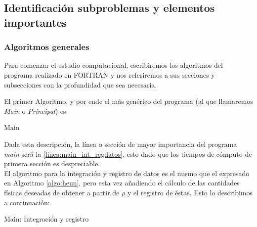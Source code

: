 \subsection{Identificaci\'on subproblemas y elementos importantes}

\subsubsection{Algoritmos generales}\label{sec:codigos_generales}
\quad Para comenzar el estudio computacional, escribiremos los algoritmos del programa realizado en FORTRAN y nos referiremos a sus secciones y subsecciones con la profundidad que sea necesaria.

\quad El primer Algoritmo, y por ende el m\'as gen\'erico del programa (al que llamaremos \emph{Main} o \emph{Principal}) es:

\begin{algorithm}[H]
 \caption{Main}\label{algo:main_completo}
\SetAlgoLined
\LinesNumbered
{}
\end{algorithm}

\quad Dada esta descripci\'on, la l\'inea o secci\'on de mayor importancia del programa \emph{main} ser\'a la \ref{linea:main_int_regdatos}, esto dado que los tiempos de c\'omputo de primera secci\'on es despreciable.\\

\quad El algoritmo para la integraci\'on y registro de datos es el mismo que el expresado en Algoritmo \ref{algo:heun}, pero esta vez a\~nadiendo el c\'alculo de las cantidades f\'isicas deseadas de obtener a partir de $\rho$ y el registro de \'estas. Esto lo describimos a continuaci\'on:

\begin{algorithm}[H]
\caption{Main: Integraci\'on y registro}\label{algo:main_int}
\LinesNumbered
{}
\end{algorithm}

